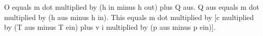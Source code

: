 O equals m dot multiplied by (h in minus h out) plus Q aus.  
Q aus equals m dot multiplied by (h aus minus h in).  
This equals m dot multiplied by [c multiplied by (T aus minus T ein) plus v i multiplied by (p aus minus p ein)].